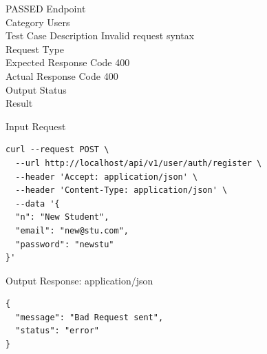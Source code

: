 \begin{testcase}{51}{PASSED}
Endpoint \hfill {}\\
Category \hfill Users\\
Test Case Description \hfill Invalid request syntax\\

Request Type    \hfill {}\\
Expected Response Code    \hfill 400\\
Actual Response Code    \hfill 400\\

Output Status \hfill {}\\
Result \hfill {}

\begin{ipblock}{Input Request}
\begin{verbatim}
curl --request POST \
  --url http://localhost/api/v1/user/auth/register \
  --header 'Accept: application/json' \
  --header 'Content-Type: application/json' \
  --data '{
  "n": "New Student",
  "email": "new@stu.com",
  "password": "newstu"
}'
\end{verbatim}
\end{ipblock}

\begin{opblock}{Output Response: application/json}
\begin{verbatim}
{
  "message": "Bad Request sent",
  "status": "error"
}
\end{verbatim}
\end{opblock}
\end{testcase}

